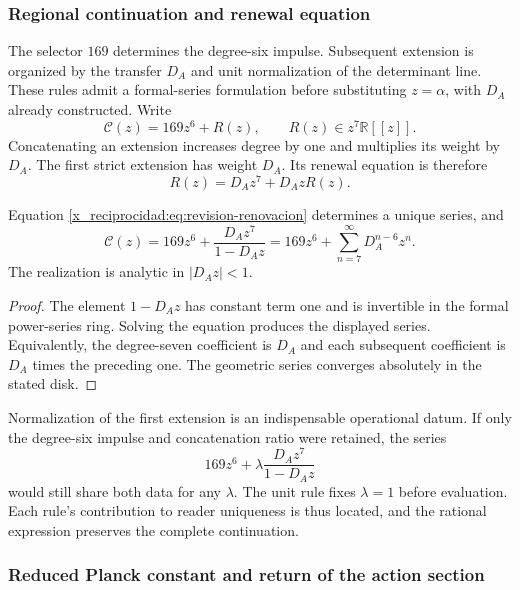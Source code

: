 \subsubsection{Regional continuation and renewal equation}

The selector \(169\) determines the degree-six impulse. Subsequent extension is organized by the transfer \(D_A\) and unit normalization of the determinant line. These rules admit a formal-series formulation before substituting \(z=\alpha\), with \(D_A\) already constructed. Write
\[
 \mathscr C(z)=169z^6+R(z),\qquad R(z)\in z^7\mathbb R[[z]].
\]
Concatenating an extension increases degree by one and multiplies its weight by \(D_A\). The first strict extension has weight \(D_A\). Its renewal equation is therefore
\begin{equation}
 R(z)=D_Az^7+D_AzR(z).
 \label{x_reciprocidad:eq:revision-renovacion}
\end{equation}

\begin{proposition}
Equation \eqref{x_reciprocidad:eq:revision-renovacion} determines a unique series, and
\[
 \mathscr C(z)=169z^6+\frac{D_Az^7}{1-D_Az}
             =169z^6+\sum_{n=7}^{\infty}D_A^{n-6}z^n.
\]
The realization is analytic in \(|D_Az|<1\).
\end{proposition}
\begin{proof}
The element \(1-D_Az\) has constant term one and is invertible in the formal power-series ring. Solving the equation produces the displayed series. Equivalently, the degree-seven coefficient is \(D_A\) and each subsequent coefficient is \(D_A\) times the preceding one. The geometric series converges absolutely in the stated disk.
\end{proof}

Normalization of the first extension is an indispensable operational datum. If only the degree-six impulse and concatenation ratio were retained, the series
\[
 169z^6+\lambda\frac{D_Az^7}{1-D_Az}
\]
would still share both data for any \(\lambda\). The unit rule fixes \(\lambda=1\) before evaluation. Each rule's contribution to reader uniqueness is thus located, and the rational expression preserves the complete continuation.

\subsubsection{Reduced Planck constant and return of the action section}


